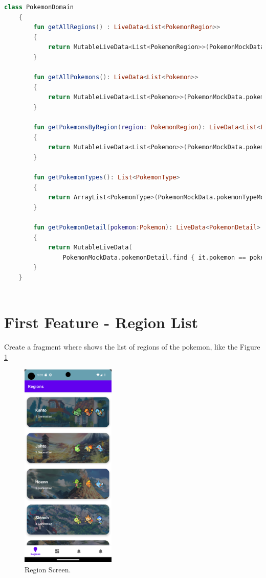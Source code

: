\documentclass[a4paper, 12pt]{article}
\begin{document}
\begin{lstlisting}[caption={Region Fragment Layout.}, label={code:screen_region_list}, language=Kotlin]
    class PokemonDomain
    {
        fun getAllRegions() : LiveData<List<PokemonRegion>>
        {
            return MutableLiveData<List<PokemonRegion>>(PokemonMockData.regions)
        }
        
        fun getAllPokemons(): LiveData<List<Pokemon>>
        {
            return MutableLiveData<List<Pokemon>>(PokemonMockData.pokemons)
        }
    
        fun getPokemonsByRegion(region: PokemonRegion): LiveData<List<Pokemon>>
        {
            return MutableLiveData<List<Pokemon>>(PokemonMockData.pokemons.filter { it.region == region })
        }
    
        fun getPokemonTypes(): List<PokemonType>
        {
            return ArrayList<PokemonType>(PokemonMockData.pokemonTypeMock)
        }
    
        fun getPokemonDetail(pokemon:Pokemon): LiveData<PokemonDetail>
        {
            return MutableLiveData(
                PokemonMockData.pokemonDetail.find { it.pokemon == pokemon })
        }
    }
    
\end{lstlisting}


\section{First Feature - Region List}

Create a fragment where shows the list of regions of the pokemon, like the Figure \ref{fig:screen_region}

\begin{figure}
	\centering
	\includegraphics[height=10cm]{imgs/region_screen.png}
	\caption{Region Screen.}
	\label{fig:screen_region}
\end{figure}
\end{document}
